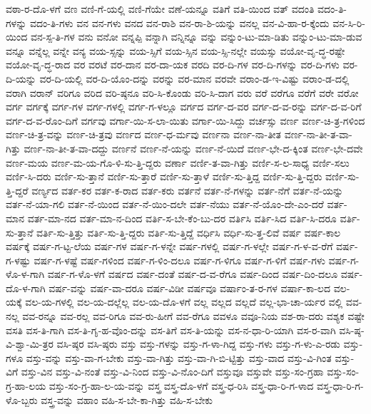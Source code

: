 {ವಠಾ-ರ-ದೊ-ಳಗೆ
ವಣ
ವಣಿ-ಗೆ-ಯಲ್ಲಿ
ವಣಿ-ಗೆಯೇ
ವಣೆ-ಯನ್ನೂ
ವತಿಗೆ
ವತಿ-ಯಿಂದ
ವತ್
ವದಂತಿ
ವದಂ-ತಿ-ಗಳನ್ನು
ವದಂ-ತಿ-ಗಳು
ವನ
ವನ-ಗಳು
ವನದ
ವನ-ರಾಶಿ
ವನ-ರಾ-ಶಿ-ಯನ್ನು
ವನಲ್ಲ
ವನ-ವಿ-ಹಾ-ರ-ಕ್ಕೆಂದು
ವನ-ಸಿ-ರಿ-ಯಿಂದ
ವನ-ಸ್ಪ-ತಿ-ಗಳ
ವನು
ವನೋ
ವನ್ನಪ್ಪಿ
ವನ್ನಾಗಿ
ವನ್ನಿನ್ನೂ
ವನ್ನು
ವನ್ನುಂ-ಟು-ಮಾ-ಡಿತು
ವನ್ನುಂ-ಟು-ಮಾ-ಡುವ
ವನ್ನೂ
ವನ್ನೆಲ್ಲ
ವನ್ನೇ
ವನ್ಯ
ವಯ-ಸ್ಸನ್ನು
ವಯ-ಸ್ಸಿಗೆ
ವಯ-ಸ್ಸಿನ
ವಯ-ಸ್ಸಿ-ನಲ್ಲೇ
ವಯಸ್ಸು
ವಯೋ-ವೃ-ದ್ಧ-ರಷ್ಟೇ
ವಯೋ-ವೃ-ದ್ಧ-ರಾದ
ವರ
ವರಟೆ
ವರ-ದಾನ
ವರ-ದಾ-ಯಕ
ವರದಿ
ವರ-ದಿ-ಗಳ
ವರ-ದಿ-ಗಳನ್ನು
ವರ-ದಿ-ಗಳು
ವರ-ದಿ-ಯನ್ನು
ವರ-ದಿ-ಯಲ್ಲಿ
ವರ-ದಿ-ಯೊಂ-ದನ್ನು
ವರನ್ನು
ವರ-ಮಾನ
ವರವೇ
ವರಾಂ-ಡ-ಇ-ವಿಷ್ಟು
ವರಾಂ-ಡ-ದಲ್ಲಿ
ವರಾಗಿ
ವರಾನ್
ವರಿಗೂ
ವರಿದ
ವರಿ-ಷ್ಠನೂ
ವರಿ-ಸಿ-ಕೊಂಡು
ವರಿ-ಸಿ-ದಾಗ
ವರು
ವರೆ
ವರೆಗೂ
ವರೆಗೆ
ವರೇ
ವರೋ
ವರ್ಗ
ವರ್ಗಕ್ಕೆ
ವರ್ಗ-ಗಳ
ವರ್ಗ-ಗಳಲ್ಲಿ
ವರ್ಗ-ಗ-ಳಲ್ಲೂ
ವರ್ಗದ
ವರ್ಗ-ದ-ವರ
ವರ್ಗ-ದ-ವ-ರನ್ನು
ವರ್ಗ-ದ-ವ-ರಿಗೆ
ವರ್ಗ-ದ-ವ-ರೊಂ-ದಿಗೆ
ವರ್ಗವು
ವರ್ಗಾ-ಯಿ-ಸ-ಲಾ-ಯಿತು
ವರ್ಗಾ-ಯಿ-ಸಿದ್ದು
ವರ್ಚಸ್ಸು
ವರ್ಣ
ವರ್ಣ-ಚಿ-ತ್ರ-ಗಳಿಂದ
ವರ್ಣ-ಚಿ-ತ್ರ-ವನ್ನು
ವರ್ಣ-ಚಿ-ತ್ರವು
ವರ್ಣದ
ವರ್ಣ-ಧ-ರ್ಮವು
ವರ್ಣನಾ
ವರ್ಣ-ನಾ-ತೀತ
ವರ್ಣ-ನಾ-ತೀ-ತ-ವಾ-ಗಿತ್ತು
ವರ್ಣ-ನಾ-ತೀ-ತ-ವಾ-ದದ್ದು
ವರ್ಣನೆ
ವರ್ಣ-ನೆ-ಯನ್ನು
ವರ್ಣ-ನೆ-ಯಿದೆ
ವರ್ಣ-ಭೇ-ದ-ಕ್ಕಿಂತ
ವರ್ಣ-ಭೇ-ದವೇ
ವರ್ಣ-ಮಯ
ವರ್ಣ-ಮ-ಯ-ಗೊ-ಳಿ-ಸು-ತ್ತಿ-ದ್ದರು
ವರ್ಣಾ
ವರ್ಣಿ-ತ-ವಾ-ಗಿತ್ತು
ವರ್ಣಿ-ಸ-ಲ-ಸಾಧ್ಯ
ವರ್ಣಿ-ಸಲು
ವರ್ಣಿ-ಸಿ-ದರು
ವರ್ಣಿ-ಸು-ತ್ತಾನೆ
ವರ್ಣಿ-ಸು-ತ್ತಾರೆ
ವರ್ಣಿ-ಸು-ತ್ತಾಳೆ
ವರ್ಣಿ-ಸು-ತ್ತಿದ್ದ
ವರ್ಣಿ-ಸು-ತ್ತಿ-ದ್ದರು
ವರ್ಣಿ-ಸು-ತ್ತಿ-ದ್ದರೆ
ವರ್ಣ್ಯದ
ವರ್ತ-ಕರ
ವರ್ತ-ಕ-ರಾದ
ವರ್ತ-ಕರು
ವರ್ತನೆ
ವರ್ತ-ನೆ-ಗಳನ್ನು
ವರ್ತ-ನೆಗೆ
ವರ್ತ-ನೆ-ಯನ್ನು
ವರ್ತ-ನೆ-ಯಾ-ಗಲಿ
ವರ್ತ-ನೆ-ಯಿಂದ
ವರ್ತ-ನೆ-ಯಿಂ-ದಲೇ
ವರ್ತ-ನೆಯು
ವರ್ತ-ನೆ-ಯೊಂ-ದೇ-ಎಂ-ದರೆ
ವರ್ತ-ಮಾನ
ವರ್ತ-ಮಾ-ನದ
ವರ್ತ-ಮಾ-ನ-ದಿಂದ
ವರ್ತಿ-ಸ-ಬೇ-ಕೆಂ-ಬು-ದರ
ವರ್ತಿಸಿ
ವರ್ತಿ-ಸಿದ
ವರ್ತಿ-ಸಿ-ದರೂ
ವರ್ತಿ-ಸು-ತ್ತಾನೆ
ವರ್ತಿ-ಸು-ತ್ತಿತ್ತು
ವರ್ತಿ-ಸು-ತ್ತಿ-ದ್ದರು
ವರ್ತಿ-ಸು-ತ್ತಿದ್ದೆ
ವರ್ಧಿಸಿ
ವರ್ಧಿ-ಸು-ತ್ತ-ಲಿವೆ
ವರ್ಷ
ವರ್ಷ-ಕಾಲ
ವರ್ಷಕ್ಕೆ
ವರ್ಷ-ಗ-ಟ್ಟ-ಲೆಯ
ವರ್ಷ-ಗಳ
ವರ್ಷ-ಗ-ಳನ್ನೇ
ವರ್ಷ-ಗಳಲ್ಲಿ
ವರ್ಷ-ಗ-ಳಲ್ಲೇ
ವರ್ಷ-ಗ-ಳ-ವ-ರೆಗೆ
ವರ್ಷ-ಗ-ಳಷ್ಟು
ವರ್ಷ-ಗ-ಳಷ್ಟೆ
ವರ್ಷ-ಗಳಿಂದ
ವರ್ಷ-ಗ-ಳಿಂ-ದಲೂ
ವರ್ಷ-ಗ-ಳಿಗೂ
ವರ್ಷ-ಗ-ಳಿಗೆ
ವರ್ಷ-ಗಳು
ವರ್ಷ-ಗ-ಳೊ-ಳ-ಗಾಗಿ
ವರ್ಷ-ಗ-ಳೊ-ಳಗೆ
ವರ್ಷದ
ವರ್ಷ-ದಂತೆ
ವರ್ಷ-ದ-ವ-ರೆಗೂ
ವರ್ಷ-ದಿಂದ
ವರ್ಷ-ದಿಂ-ದಲೂ
ವರ್ಷ-ದೊ-ಳ-ಗಾಗಿ
ವರ್ಷ-ವನ್ನು
ವರ್ಷ-ವಾ-ದರೂ
ವರ್ಷ-ವಿಡೀ
ವರ್ಷವೂ
ವರ್ಷಾಂ-ತ-ರ-ಗಳ
ವರ್ಷಾ-ಕಾ-ಲದ
ವಲ-ಯಕ್ಕೆ
ವಲ-ಯ-ಗಳಲ್ಲಿ
ವಲ-ಯ-ದಲ್ಲೆಲ್ಲ
ವಲ-ಯ-ದೊ-ಳಗೆ
ವಲ್ಲ
ವಲ್ಲದ
ವಲ್ಲದೆ
ವಲ್ಲ-ಭಾ-ಚಾ-ರ್ಯರ
ವಲ್ಲಿ
ವವ-ನಲ್ಲ
ವವ-ರನ್ನೂ
ವವ-ರಲ್ಲ
ವವ-ರಿಗೂ
ವವ-ರು-ಹೀಗೆ
ವವ-ರೆಗೂ
ವವಳೂ
ವವೂ-ನಿಯ
ವಶ-ರಾ-ದರು
ವಶ್ಯಕ
ವಷ್ಟೇ
ವಸತಿ
ವಸ-ತಿ-ಗಾಗಿ
ವಸ-ತಿ-ಗೃ-ಹ-ವೊಂ-ದನ್ನು
ವಸ-ತಿಗೆ
ವಸ-ತಿ-ಯನ್ನು
ವಸ-ನ-ಧಾ-ರಿ-ಯಾಗಿ
ವಸ-ರ-ವಾಗಿ
ವಸಿ-ಷ್ಠ-ವಿ-ಶ್ವಾ-ಮಿ-ತ್ರರ
ವಸಿ-ಷ್ಠರ
ವಸಿ-ಷ್ಠರು
ವಸ್ತು
ವಸ್ತು-ಗಳನ್ನು
ವಸ್ತು-ಗ-ಳಾ-ಗಿದ್ದ
ವಸ್ತು-ಗಳು
ವಸ್ತು-ಗ-ಳು-ಎ-ರಡು
ವಸ್ತು-ಗಳೂ
ವಸ್ತು-ವನ್ನು
ವಸ್ತು-ವಾ-ಗ-ಬೇಕು
ವಸ್ತು-ವಾ-ಗಿತ್ತು
ವಸ್ತು-ವಾ-ಗಿ-ಬಿ-ಟ್ಟಿತ್ತು
ವಸ್ತು-ವಾದ
ವಸ್ತು-ವಿ-ಗಿಂತ
ವಸ್ತು-ವಿಗೆ
ವಸ್ತು-ವಿನ
ವಸ್ತು-ವಿ-ನಂತೆ
ವಸ್ತು-ವಿ-ನಿಂದ
ವಸ್ತು-ವಿ-ನೊಂ-ದಿಗೆ
ವಸ್ತುವೂ
ವಸ್ತುವೇ
ವಸ್ತು-ಸಂ-ಗ್ರಹಾ
ವಸ್ತು-ಸಂ-ಗ್ರ-ಹಾ-ಲಯ
ವಸ್ತು-ಸಂ-ಗ್ರ-ಹಾ-ಲ-ಯ-ವನ್ನು
ವಸ್ತ್ರ
ವಸ್ತ್ರ-ದೊ-ಳಗೆ
ವಸ್ತ್ರ-ಧ-ರಿಸಿ
ವಸ್ತ್ರ-ಧಾ-ರಿ-ಗ-ಳಾದ
ವಸ್ತ್ರ-ಧಾ-ರಿ-ಗ-ಳೊ-ಬ್ಬರು
ವಸ್ತ್ರ-ವನ್ನು
ವಹಾಂ
ವಹಿ-ಸ-ಬೇ-ಕಾ-ಗಿತ್ತು
ವಹಿ-ಸ-ಬೇಕು
}
